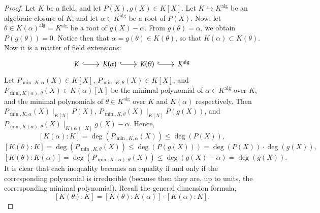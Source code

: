 \documentclass[11pt, a4paper, oneside]{article}
\theoremstyle{remark}
\theoremstyle{lemma}
\begin{document}
\begin{proof}
Let \( K \) be a field, and let \( P(X), g(X) \in K[X] \). Let \( K \hookrightarrow K^{\text{alg}} \) be an algebraic closure of \( K \), and let \( \alpha \in K^{\text{alg}} \) be a root of \( P(X) \). Now, let \( \theta \in K(\alpha)^{\text{alg}} = K^{\text{alg}} \) be a root of \( g(X) - \alpha \). From \( g(\theta) = \alpha \), we obtain \( P\left( g(\theta) \right) = 0 \). Notice then that \( \alpha=g(\theta) \in K(\theta) \), so that \( K(\alpha) \subset K(\theta) \). Now it is a matter of field extensions:
\[
\begin{tikzcd}
	K & {K(\alpha)} & {K(\theta)} & {K^{\mathrm{alg}}}
	\arrow[hook, from=1-1, to=1-2]
	\arrow[hook, from=1-2, to=1-3]
	\arrow[hook, from=1-3, to=1-4]
\end{tikzcd}
\]
Let \( P_{\min, K, \alpha}(X) \in K[X] \), \( P_{\min, K, \theta}(X) \in K[X] \), and \( P_{\min, K(\alpha), \theta}(X) \in K(\alpha)[X] \) be the minimal polynomial of \( \alpha \in K^{\text{alg}} \) over \( K \), and the minimal polynomials of \( \theta \in K^{\text{alg}} \) over \( K \) and \( K(\alpha) \) respectively. Then \( P_{\min, K, \alpha}(X) \mid_{K[X]} P(X) \), \( P_{\min, K, \theta}(X) \mid_{K[X]} P(g(X)) \), and \( P_{\min, K(\alpha), \theta}(X) \mid_{K(\alpha)[X]} g(X) - \alpha \). Hence,
\begin{equation}
\label{A.1.1}
\tag{1}
\left[ K(\alpha) : K \right] = \deg\left( P_{\min, K, \alpha}(X) \right) \leq \deg\left( P(X) \right),
\end{equation}
\begin{equation}
\label{A.1.2}
\tag{2}
\left[ K(\theta) : K \right] = \deg\left( P_{\min, K, \theta}(X) \right) \leq \deg\left( P\left( g(X) \right) \right) = \deg\left( P(X) \right) \cdot \deg\left( g(X) \right),
\end{equation}
\begin{equation}
\label{A.1.3}
\tag{3}
\left[ K(\theta) : K(\alpha) \right] = \deg\left( P_{\min, K(\alpha), \theta}(X) \right) \leq \deg\left( g(X) - \alpha \right) = \deg\left( g(X) \right).
\end{equation}
It is clear that each inequality becomes an equality if and only if the corresponding polynomial is irreducible (because then they are, up to units, the corresponding minimal polynomial). Recall the general dimension formula,
\begin{equation}
\label{A.1.4}
\tag{4}
\left[ K(\theta) : K \right] = \left[ K(\theta) : K(\alpha) \right] \cdot \left[ K(\alpha) : K \right].
\end{equation}

\end{proof}
\end{document}

